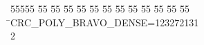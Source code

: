 %
%
\begin{tabbing}
55555 \= 55 \= 55 \= 55 \= 55 \= 55 \= 55 \= 55 \= 55 \= 55 \= 55 \= 55 \= 55 \= \>CRC\_POLY\_BRAVO\_DENSE=123272131\\[0pt]
2\>\end{tabbing}
